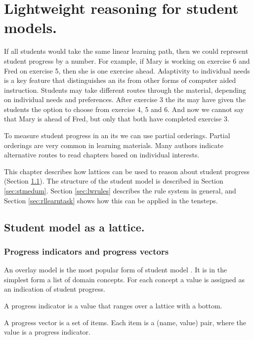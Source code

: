 \chapter{Lightweight reasoning for student models.}

If all students would take the same linear learning path, then we could represent student progress by a number.
For example, if Mary is working on exercise 6 and Fred on exercise 5, then she is one exercise ahead.
Adaptivity to individual needs is a key feature that distinguishes an \gls{its} from other forms of computer aided instruction.
Students may take different routes through the material, depending on individual needs and preferences.
After exercise 3 the \gls{its} may have given the students the option to choose from exercise 4, 5 and 6.
And now we cannot say that Mary is ahead of Fred, but only that both have completed exercise 3.

To measure student progress in an \gls{its} we can use partial orderings.
Partial orderings are very common in learning materials. 
Many authors indicate alternative routes to read chapters based on individual interests.

This chapter describes  how lattices can be used to reason about student progress (Section \ref{stmlat}).
The structure of the student model is described in Section \ref{sec:stmedum}.
Section \ref{sec:lwrules} describes the rule system in general, and Section \ref{sec:rllearntask} shows how this can be applied in the \gls{tensteps}.


\section{Student model as a lattice.}
\label{stmlat}

\subsection{Progress indicators and progress vectors}
An overlay model is the most popular form of student model \citep{chrysafiadi_2013}.
It is in the simplest form a list of domain concepts.
For each concept a value is assigned as an indication of student progress.

\begin{definition}
A progress indicator is a value that ranges over a lattice with a bottom.
\end{definition}
\begin{definition}
A progress vector is a set of items. Each item is a (name, value) pair, where the value is a progress indicator.
\end{definition}

